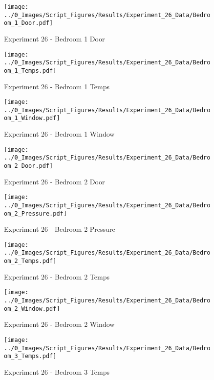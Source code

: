 	\begin{figure}[H]
		\centering
		\texttt{[image: ../0\_Images/Script\_Figures/Results/Experiment\_26\_Data/Bedroom\_1\_Door.pdf]}
		\caption[]{Experiment 26 - Bedroom 1 Door}
	\end{figure}
 

	\begin{figure}[H]
		\centering
		\texttt{[image: ../0\_Images/Script\_Figures/Results/Experiment\_26\_Data/Bedroom\_1\_Temps.pdf]}
		\caption[]{Experiment 26 - Bedroom 1 Temps}
	\end{figure}
 
	\clearpage

	\begin{figure}[H]
		\centering
		\texttt{[image: ../0\_Images/Script\_Figures/Results/Experiment\_26\_Data/Bedroom\_1\_Window.pdf]}
		\caption[]{Experiment 26 - Bedroom 1 Window}
	\end{figure}
 

	\begin{figure}[H]
		\centering
		\texttt{[image: ../0\_Images/Script\_Figures/Results/Experiment\_26\_Data/Bedroom\_2\_Door.pdf]}
		\caption[]{Experiment 26 - Bedroom 2 Door}
	\end{figure}
 
	\clearpage

	\begin{figure}[H]
		\centering
		\texttt{[image: ../0\_Images/Script\_Figures/Results/Experiment\_26\_Data/Bedroom\_2\_Pressure.pdf]}
		\caption[]{Experiment 26 - Bedroom 2 Pressure}
	\end{figure}
 

	\begin{figure}[H]
		\centering
		\texttt{[image: ../0\_Images/Script\_Figures/Results/Experiment\_26\_Data/Bedroom\_2\_Temps.pdf]}
		\caption[]{Experiment 26 - Bedroom 2 Temps}
	\end{figure}
 
	\clearpage

	\begin{figure}[H]
		\centering
		\texttt{[image: ../0\_Images/Script\_Figures/Results/Experiment\_26\_Data/Bedroom\_2\_Window.pdf]}
		\caption[]{Experiment 26 - Bedroom 2 Window}
	\end{figure}
 

	\begin{figure}[H]
		\centering
		\texttt{[image: ../0\_Images/Script\_Figures/Results/Experiment\_26\_Data/Bedroom\_3\_Temps.pdf]}
		\caption[]{Experiment 26 - Bedroom 3 Temps}
	\end{figure}
 
